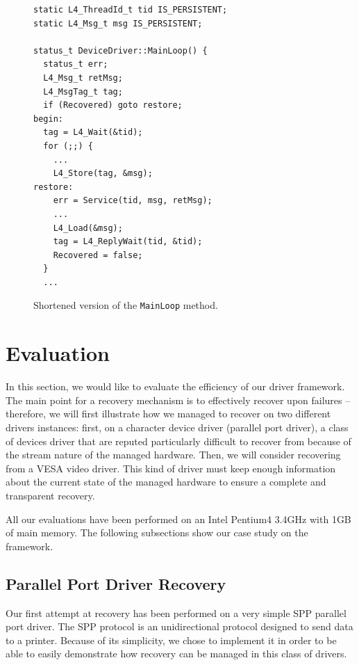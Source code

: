 \documentclass{acm_proc_article-sp}
\begin{document}
\begin{figure}[ht]
\centering
\begin{screen}
\begin{verbatim}
static L4_ThreadId_t tid IS_PERSISTENT;
static L4_Msg_t msg IS_PERSISTENT;

status_t DeviceDriver::MainLoop() {
  status_t err;
  L4_Msg_t retMsg;
  L4_MsgTag_t tag;
  if (Recovered) goto restore;
begin:
  tag = L4_Wait(&tid);
  for (;;) {
    ...
    L4_Store(tag, &msg);
restore:
    err = Service(tid, msg, retMsg);
    ...
    L4_Load(&msg);
    tag = L4_ReplyWait(tid, &tid);
    Recovered = false;
  }
  ...
\end{verbatim}
\end{screen}
\caption{Shortened version of the \texttt{MainLoop} method.}
\label{fig:mainloop}
\end{figure}

\section{Evaluation}
\label{s:eval}

In this section, we would like to evaluate the efficiency of our driver framework. The main point for a recovery mechanism is to effectively recover upon failures -- therefore, we will first illustrate how we managed to recover on two different drivers instances: first, on a character device driver (parallel port driver), a class of devices driver that are reputed particularly difficult to recover from because of the stream nature of the managed hardware. Then, we will consider recovering from a VESA video driver. This kind of driver must keep enough information about the current state of the managed hardware to ensure a complete and transparent recovery.

All our evaluations have been performed on an Intel Pentium4 3.4GHz with 1GB of main memory.  The following subsections show our case study on the framework.

\subsection{Parallel Port Driver Recovery}
Our first attempt at recovery has been performed on a very simple SPP parallel port driver. The SPP protocol is an unidirectional protocol designed to send data to a printer. Because of its simplicity, we chose to implement it in order to be able to easily demonstrate how recovery can be managed in this class of drivers.
\end{document}
